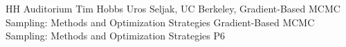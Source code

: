 {HH Auditorium}	%
{Tim Hobbs}		%
{Uros Seljak, UC Berkeley, Gradient-Based MCMC Sampling: Methods and Optimization Strategies}	%
{Gradient-Based MCMC Sampling: Methods and Optimization Strategies}		%
{P6}		%
\\\hline
